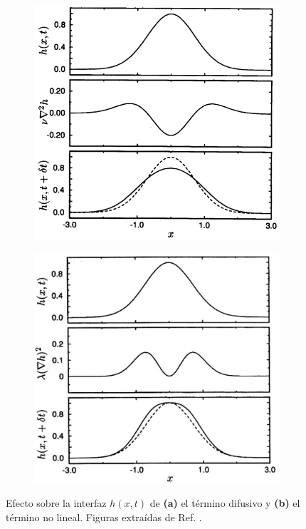\begin{figure}[!t]
    \hspace*{-1cm}
    \begin{subfigure}{.55\textwidth}
      \centering
      \includegraphics[width=\textwidth]{diffusive_term.png}
      \caption{}
    \end{subfigure}
    \begin{subfigure}{.55\textwidth}
      \centering
      \includegraphics[width=\textwidth]{non_linear_term.png}
      \caption{}
    \end{subfigure}
    \caption[Término difusivo y no lineal de la ecuación de KPZ.]{Efecto sobre la interfaz $h(x,t)$ de \textbf{(a)} el término difusivo y \textbf{(b)} el término no lineal. Figuras extraídas de Ref. \cite{barabasi}.}
    \label{fig:KPZ}
\end{figure}

